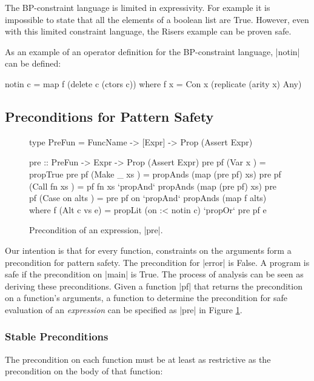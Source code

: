 The BP-constraint language is limited in expressivity. For example it is impossible to state that all the elements of a boolean list are True. However, even with this limited constraint language, the Risers example can be proven safe.

As an example of an operator definition for the BP-constraint language, |notin| can be defined:

\begin{code}
notin c = map f (delete c (ctors c))
   where f x = Con x (replicate (arity x) Any)
\end{code}


\subsection{Preconditions for Pattern Safety}
\label{sec:precond}

\begin{figure}
\begin{code}
type PreFun = FuncName -> [Expr] -> Prop (Assert Expr)

pre :: PreFun -> Expr -> Prop (Assert Expr)
pre pf (Var   x         ) = propTrue
pre pf (Make  _   xs    ) = propAnds (map (pre pf) xs)
pre pf (Call  fn  xs    ) = pf fn xs `propAnd` propAnds (map (pre pf) xs)
pre pf (Case  on  alts  ) = pre pf on `propAnd` propAnds (map f alts)
    where f (Alt c vs e) = propLit (on :< notin c) `propOr` pre pf e
\end{code}
\caption{Precondition of an expression, |pre|.}
\label{fig:precondition}
\end{figure}

Our intention is that for every function, constraints on the arguments form a precondition for pattern safety. The precondition for |error| is False. A program is safe if the precondition on |main| is True. The process of analysis can be seen as deriving these preconditions. Given a function |pf| that returns the precondition on a function's arguments, a function to determine the precondition for safe evaluation of an \textit{expression} can be specified as |pre| in Figure \ref{fig:precondition}.

\subsubsection{Stable Preconditions}
\label{sec:fixp_precond}

The precondition on each function must be at least as restrictive as the precondition on the body of that function:


